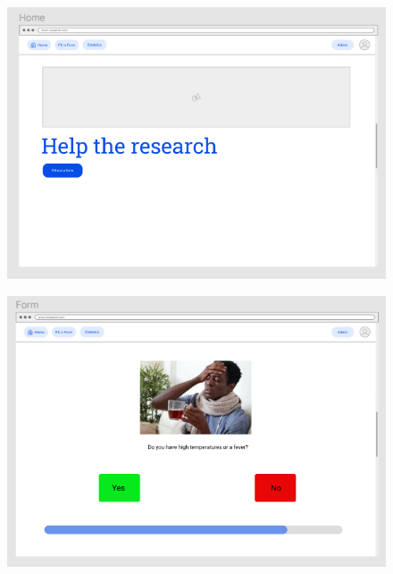 \documentclass{l3proj}
\begin{document}
\begin{figure}[H]
\centering
\begin{minipage}{.5\textwidth}
  \centering
  \includegraphics[width=0.8\linewidth]{images/HomeV1.png}
  \label{fig:HomeV1}
\end{minipage}%
\begin{minipage}{.5\textwidth}
  \centering
  \includegraphics[width=0.8\linewidth]{images/FormV1.png}
  \label{fig:FormV1}
\end{minipage}
\end{figure}
\end{document}
